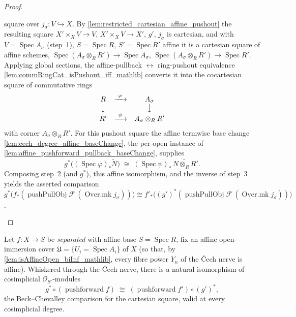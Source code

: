 \begin{proof}
\begin{enumerate}
      square over \(j_\sigma : V \hookrightarrow X\). By
      \cref{lem:restricted_cartesian_affine_pushout} the resulting square
      \(X' \times_X V \to V\), \(X' \times_X V \to X'\), \(g'\), \(j_\sigma\) is cartesian, and
      with \(V = \operatorname{Spec} A_\sigma\) (step~1), \(S = \operatorname{Spec} R\),
      \(S' = \operatorname{Spec} R'\) affine it is a cartesian square of affine schemes,
      \(\operatorname{Spec}(A_\sigma \otimes_R R') \to \operatorname{Spec} A_\sigma\),
      \(\operatorname{Spec}(A_\sigma \otimes_R R') \to \operatorname{Spec} R'\). Applying global
      sections, the affine-pullback \(\leftrightarrow\) ring-pushout equivalence
      \cref{lem:commRingCat_isPushout_iff_mathlib} converts it into the cocartesian square of
      commutative rings
      \[
        \begin{array}{ccc}
          R & \xrightarrow{\ \varphi\ } & A_\sigma\\
          \big\downarrow & & \big\downarrow\\
          R' & \xrightarrow{\ \psi\ } & A_\sigma \otimes_R R'
        \end{array}
      \]
      with corner \(A_\sigma \otimes_R R'\). For this pushout square the affine termwise base
      change \cref{lem:cech_degree_affine_baseChange}, the per-open instance of
      \cref{lem:affine_pushforward_pullback_baseChange}, supplies
      \[
        g^*\bigl((\operatorname{Spec}\varphi)_*\widetilde{N}\bigr)
          \;\cong\; (\operatorname{Spec}\psi)_*\,\widetilde{N \otimes_R R'}.
      \]
      Composing step~2 (and \(g^*\)), this affine isomorphism, and the inverse of step~3 yields
      the asserted comparison
      \(g^*\bigl(f_*(\operatorname{pushPullObj}\mathcal{F}\,(\operatorname{Over.mk}
      j_\sigma))\bigr) \cong f'_*\bigl((g')^*(\operatorname{pushPullObj}\mathcal{F}\,
      (\operatorname{Over.mk} j_\sigma))\bigr)\).
  \end{enumerate}
\end{proof}

\begin{lemma}
  \label{lem:cech_pushforward_baseChange_natIso}
  Let \(f : X \to S\) be \emph{separated} with affine base \(S = \operatorname{Spec} R\),
  fix an affine open-immersion cover \(\mathfrak{U} = \{U_i = \operatorname{Spec} A_i\}\) of
  \(X\) (so that, by \cref{lem:isAffineOpen_biInf_mathlib}, every fibre power \(Y_n\) of the
  {\v C}ech nerve is affine). Whiskered through the {\v C}ech nerve, there is a natural
  isomorphism of cosimplicial \(\mathcal{O}_{S'}\)-modules
  \[
    g^* \circ (\operatorname{pushforward} f) \;\cong\;
      (\operatorname{pushforward} f') \circ (g')^*,
  \]
  the Beck--Chevalley comparison for the cartesian square, valid at every cosimplicial
  degree.
\end{lemma}

